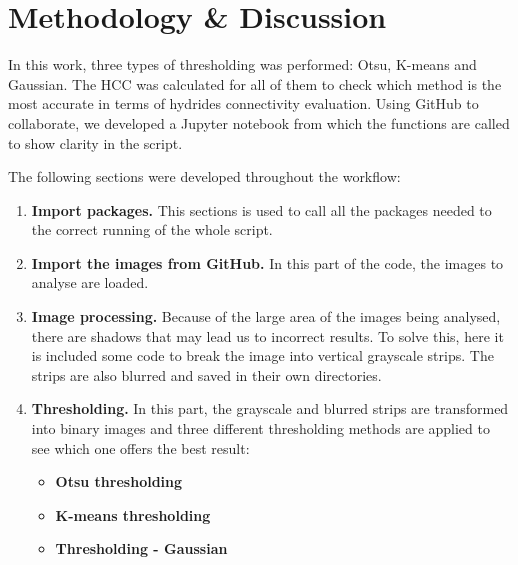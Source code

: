 \section{Methodology \& Discussion}

In this work, three types of thresholding was performed: Otsu, K-means and Gaussian. The HCC was calculated for all of them to check which method is the most accurate in terms of hydrides connectivity evaluation. Using GitHub to collaborate, we developed a Jupyter notebook from which the functions are called to show clarity in the script.

\noindent
The following sections were developed throughout the workflow:

\begin{enumerate}

    \item \textbf{Import packages.}
This sections is used to call all the packages needed to the correct running of the whole script.

    \item\textbf{ Import the images from GitHub.}
In this part of the code, the images to analyse are loaded.

    \item \textbf{Image processing.}
Because of the large area of the images being analysed, there are shadows that may lead us to incorrect results. To solve this, here it is included some code to break the image into vertical grayscale strips. The strips are also blurred and saved in their own directories.

    \item \textbf{Thresholding.}
In this part, the grayscale and blurred strips are transformed into binary images and three different thresholding methods are applied to see which one offers the best result:

\begin{itemize}
\item \textbf{Otsu thresholding}
\end{itemize}

\begin{itemize}
\item \textbf{K-means thresholding}
\end{itemize}

\begin{itemize}
\item \textbf{Thresholding - Gaussian}
\end{itemize}


\end{enumerate}
